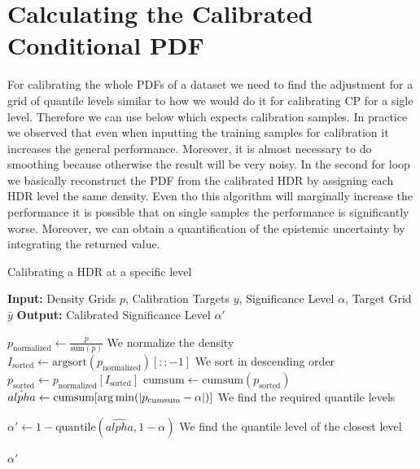 \section{Calculating the Calibrated Conditional PDF}

For calibrating the whole PDFs of a dataset we need to find the adjustment for a grid of quantile levels similar to how we would do it for calibrating CP for a sigle level. Therefore we can use  below which expects calibration samples. In practice we observed that even when inputting the training samples for calibration it increases the general performance. Moreover, it is almost necessary to do smoothing because otherwise the result will be very noisy. In the second for loop we basically reconstruct the PDF from the calibrated HDR by assigning each HDR level the same density. Even tho this algorithm will marginally increase the performance it is possible that on single samples the performance is significantly worse. Moreover, we can obtain a quantification of the epistemic uncertainty by integrating the returned value.

\begin{algorithm}
    \caption{Calibrating a HDR at a specific level}
    \label{alg:calibrate_hdr}
    \begin{algorithmic}
        \STATE \textbf{Input:} Density Grids $p$, Calibration Targets $y$, Significance Level $\alpha$, Target Grid $\bar{y}$
        \STATE \textbf{Output:} Calibrated Significance Level $\alpha'$
        
        \STATE $p_{\text{normalized}} \leftarrow \frac{p}{\text{sum}(p)}$ We normalize the density
        \STATE $I_{\text{sorted}} \leftarrow \text{argsort}(p_{\text{normalized}})[::-1]$ We sort in descending order
        \STATE $p_{\text{sorted}} \leftarrow p_{\text{normalized}}[I_{\text{sorted}}]$
        \STATE $\text{cumsum} \leftarrow \text{cumsum}(p_{\text{sorted}})$ 
        \STATE $\hat{alpha} \leftarrow \text{cumsum}[\operatorname*{arg\,min}(|p_{\text{cumsum}} - \alpha|)]$ We find the required quantile levels

        \STATE $\alpha' \leftarrow 1 - \text{quantile}(\hat{alpha}, 1 - \alpha)$ We find the quantile level of the closest level

        \RETURN $\alpha'$
        
    \end{algorithmic}
\end{algorithm}



